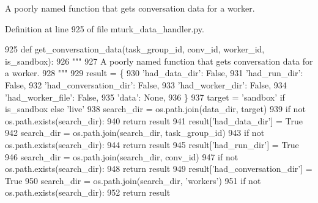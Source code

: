 \begin{DoxyVerb}A poorly named function that gets conversation data for a worker.
\end{DoxyVerb}
 

Definition at line 925 of file mturk\+\_\+data\+\_\+handler.\+py.


\begin{DoxyCode}
925     \textcolor{keyword}{def }get\_conversation\_data(task\_group\_id, conv\_id, worker\_id, is\_sandbox):
926         \textcolor{stringliteral}{"""}
927 \textcolor{stringliteral}{        A poorly named function that gets conversation data for a worker.}
928 \textcolor{stringliteral}{        """}
929         result = \{
930             \textcolor{stringliteral}{'had\_data\_dir'}: \textcolor{keyword}{False},
931             \textcolor{stringliteral}{'had\_run\_dir'}: \textcolor{keyword}{False},
932             \textcolor{stringliteral}{'had\_conversation\_dir'}: \textcolor{keyword}{False},
933             \textcolor{stringliteral}{'had\_worker\_dir'}: \textcolor{keyword}{False},
934             \textcolor{stringliteral}{'had\_worker\_file'}: \textcolor{keyword}{False},
935             \textcolor{stringliteral}{'data'}: \textcolor{keywordtype}{None},
936         \}
937         target = \textcolor{stringliteral}{'sandbox'} \textcolor{keywordflow}{if} is\_sandbox \textcolor{keywordflow}{else} \textcolor{stringliteral}{'live'}
938         search\_dir = os.path.join(data\_dir, target)
939         \textcolor{keywordflow}{if} \textcolor{keywordflow}{not} os.path.exists(search\_dir):
940             \textcolor{keywordflow}{return} result
941         result[\textcolor{stringliteral}{'had\_data\_dir'}] = \textcolor{keyword}{True}
942         search\_dir = os.path.join(search\_dir, task\_group\_id)
943         \textcolor{keywordflow}{if} \textcolor{keywordflow}{not} os.path.exists(search\_dir):
944             \textcolor{keywordflow}{return} result
945         result[\textcolor{stringliteral}{'had\_run\_dir'}] = \textcolor{keyword}{True}
946         search\_dir = os.path.join(search\_dir, conv\_id)
947         \textcolor{keywordflow}{if} \textcolor{keywordflow}{not} os.path.exists(search\_dir):
948             \textcolor{keywordflow}{return} result
949         result[\textcolor{stringliteral}{'had\_conversation\_dir'}] = \textcolor{keyword}{True}
950         search\_dir = os.path.join(search\_dir, \textcolor{stringliteral}{'workers'})
951         \textcolor{keywordflow}{if} \textcolor{keywordflow}{not} os.path.exists(search\_dir):
952             \textcolor{keywordflow}{return} result

\end{DoxyCode}
